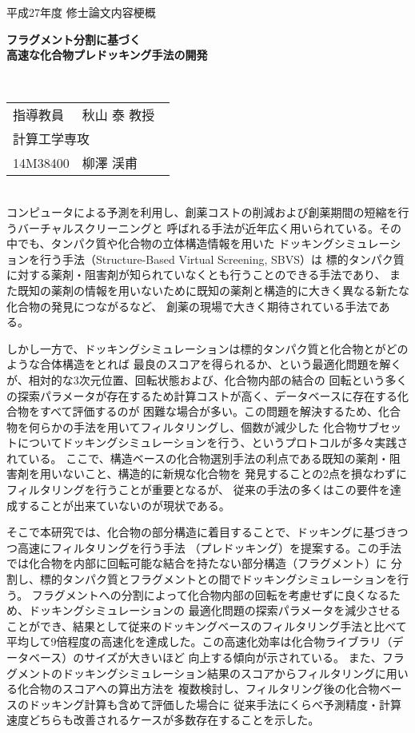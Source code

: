 {
 \thispagestyle{empty}
 \large
 \noindent
 平成27年度 修士論文内容梗概
　\\
 \begin{center}
  \textbf{\LARGE フラグメント分割に基づく\\高速な化合物プレドッキング手法の開発}
 \end{center}
　\\
 \hfill 
 \begin{tabular}{llll}
 指導教員& \multicolumn{3}{l}{秋山 泰 教授} \\
  \multicolumn{4}{l}{計算工学専攻} \\
 14M38400\hspace{.5cm} & {柳澤 渓甫}
 \end{tabular}

\mbox{}\\
コンピュータによる予測を利用し、創薬コストの削減および創薬期間の短縮を行うバーチャルスクリーニングと
呼ばれる手法が近年広く用いられている。その中でも、タンパク質や化合物の立体構造情報を用いた
ドッキングシミュレーションを行う手法（Structure-Based Virtual Screening, SBVS）は
標的タンパク質に対する薬剤・阻害剤が知られていなくとも行うことのできる手法であり、
また既知の薬剤の情報を用いないために既知の薬剤と構造的に大きく異なる新たな化合物の発見につながるなど、
創薬の現場で大きく期待されている手法である。

しかし一方で、ドッキングシミュレーションは標的タンパク質と化合物とがどのような合体構造をとれば
最良のスコアを得られるか、という最適化問題を解くが、相対的な3次元位置、回転状態および、化合物内部の結合の
回転という多くの探索パラメータが存在するため計算コストが高く、データベースに存在する化合物をすべて評価するのが
困難な場合が多い。この問題を解決するため、化合物を何らかの手法を用いてフィルタリングし、個数が減少した
化合物サブセットについてドッキングシミュレーションを行う、というプロトコルが多々実践されている。
ここで、構造ベースの化合物選別手法の利点である既知の薬剤・阻害剤を用いないこと、構造的に新規な化合物を
発見することの2点を損なわずにフィルタリングを行うことが重要となるが、
従来の手法の多くはこの要件を達成することが出来ていないのが現状である。

そこで本研究では、化合物の部分構造に着目することで、ドッキングに基づきつつ高速にフィルタリングを行う手法
（プレドッキング）を提案する。この手法では化合物を内部に回転可能な結合を持たない部分構造（フラグメント）に
分割し、標的タンパク質とフラグメントとの間でドッキングシミュレーションを行う。
フラグメントへの分割によって化合物内部の回転を考慮せずに良くなるため、ドッキングシミュレーションの
最適化問題の探索パラメータを減少させることができ、結果として従来のドッキングベースのフィルタリング手法と比べて
平均して9倍程度の高速化を達成した。この高速化効率は化合物ライブラリ（データベース）のサイズが大きいほど
向上する傾向が示されている。
また、フラグメントのドッキングシミュレーション結果のスコアからフィルタリングに用いる化合物のスコアへの算出方法を
複数検討し、フィルタリング後の化合物ベースのドッキング計算も含めて評価した場合に
従来手法にくらべ予測精度・計算速度どちらも改善されるケースが多数存在することを示した。

\thispagestyle{empty}
\addtocounter{page}{-1}
}
